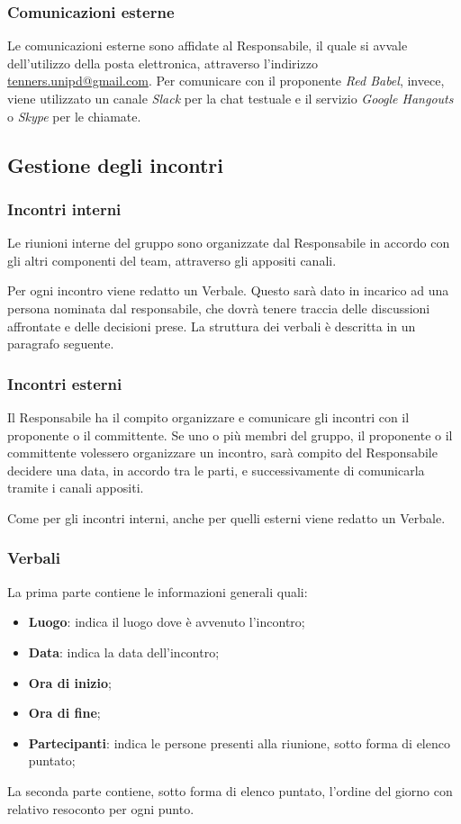    		\subsubsection{Comunicazioni esterne}
   		Le comunicazioni esterne sono affidate al Responsabile, il quale si avvale dell'utilizzo della posta elettronica, attraverso l'indirizzo \href{mailto:tenners.unipd@gmail.com}{tenners.unipd@gmail.com}.
   		Per comunicare con il proponente \textit{Red Babel}, invece, viene utilizzato un canale \textit{Slack\glo} per la chat testuale e il servizio \textit{Google Hangouts\glos} o \textit{Skype\glo} per le chiamate. 
   		
   	\subsection{Gestione degli incontri}
   		\subsubsection{Incontri interni}
   		Le riunioni interne del gruppo sono organizzate dal Responsabile in accordo con gli altri componenti del team, attraverso gli appositi canali.
   		
   		\noindent Per ogni incontro viene redatto un Verbale. Questo sarà dato in incarico ad una persona nominata dal responsabile, che dovrà tenere traccia delle discussioni affrontate e delle decisioni prese. La struttura dei verbali è descritta in un paragrafo seguente.
   		
   		\subsubsection{Incontri esterni}
   		Il Responsabile ha il compito organizzare e comunicare gli incontri con il proponente o il committente. Se uno o più membri del gruppo, il proponente o il committente volessero organizzare un incontro, sarà compito del Responsabile decidere una data, in accordo tra le parti, e successivamente di comunicarla tramite i canali appositi.
   		
   		\noindent Come per gli incontri interni, anche per quelli esterni viene redatto un Verbale.
   		\subsubsection{Verbali}
   		La prima parte contiene le informazioni generali quali:
   		\begin{itemize}
   			\item \textbf{Luogo}: indica il luogo dove è avvenuto l'incontro;
   			\item \textbf{Data}: indica la data dell'incontro;
   			\item \textbf{Ora di inizio};
   			\item \textbf{Ora di fine};
   			\item \textbf{Partecipanti}: indica le persone presenti alla riunione, sotto forma di elenco puntato;
   		\end{itemize}
   		La seconda parte contiene, sotto forma di elenco puntato, l'ordine del giorno con relativo resoconto per ogni punto.
   		
